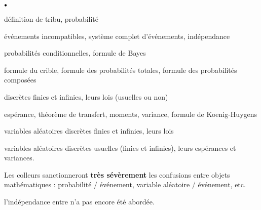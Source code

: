 \documentclass[11pt]{article}%
\begin{document}
\begin{noliste}{$\scriptstyle \bullet$}
\item définition de tribu, probabilité
\item événements incompatibles, système complet d'événements, 
indépendance
\item probabilités conditionnelles, formule de Bayes
\item formule du crible, formule des probabilités totales, formule des 
probabilités composées
\item \var discrètes finies et infinies, leurs lois (usuelles ou non)
\item espérance, théorème de transfert, moments, variance, formule de 
Koenig-Huygens
\item variables aléatoires discrètes finies et infinies, leurs lois
\item variables aléatoires discrètes usuelles (finies et infinies), 
leurs espérances et variances.
\item Les colleurs sanctionneront {\bf très sévèrement} les confusions 
entre objets mathématiques : probabilité / événement, variable aléatoire 
/ événement, etc.
\item l'indépendance entre \var n'a pas encore été abordée.
\end{noliste}
\end{document}
